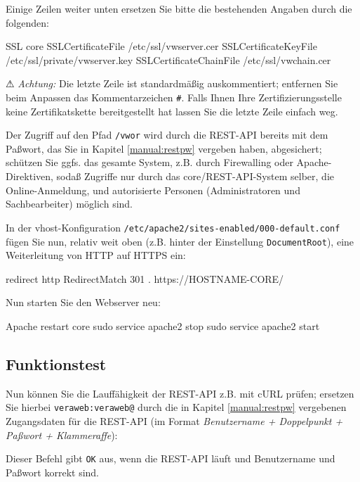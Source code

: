 \documentclass{tarentanleitung}
\begin{document}
\begin{minipage}{\linewidth}
Einige Zeilen weiter unten ersetzen Sie bitte die bestehenden
Angaben durch die folgenden:

\begin{lstdump}{SSL core}
SSLCertificateFile /etc/ssl/vwserver.cer
SSLCertificateKeyFile /etc/ssl/private/vwserver.key
SSLCertificateChainFile /etc/ssl/vwchain.cer
\end{lstdump}

⚠ \emph{Achtung:} Die letzte Zeile ist standardmäßig auskommentiert;
entfernen Sie beim Anpassen das Kommentarzeichen \texttt{\#}. Falls
Ihnen Ihre Zertifizierungsstelle keine Zertifikatskette bereitgestellt
hat lassen Sie die letzte Zeile einfach weg.
\end{minipage}

Der Zugriff auf den Pfad \texttt{/vwor} wird durch die REST-API bereits
mit dem Paßwort, das Sie in Kapitel \ref{manual:restpw} vergeben haben,
abgesichert; schützen Sie ggfs. das gesamte System, z.B. durch Firewalling
oder Apache-Direktiven, sodaß Zugriffe nur durch das core/REST-API-System
selber, die Online-Anmeldung, und autorisierte Personen (Administratoren
und Sachbearbeiter) möglich sind.

\begin{minipage}{\linewidth}
In der vhost-Konfiguration \texttt{/etc/apache2/sites-enabled/000-default.conf}
fügen Sie nun, relativ weit oben (z.B. hinter der Einstellung
\texttt{DocumentRoot}), eine Weiterleitung von HTTP auf HTTPS ein:

\begin{lstdump}{redirect http}
RedirectMatch 301 . https://HOSTNAME-CORE/
\end{lstdump}
\end{minipage}

\begin{minipage}{\linewidth}
Nun starten Sie den Webserver neu:

\begin{lstdump}{Apache restart core}
sudo service apache2 stop
sudo service apache2 start
\end{lstdump}
\end{minipage}

\subsection{Funktionstest}\label{subsec:setup-core-check}

\begin{minipage}{\linewidth}
Nun können Sie die Lauffähigkeit der REST-API z.B. mit cURL prüfen;
ersetzen Sie hierbei \texttt{veraweb:veraweb@} durch die in Kapitel
\ref{manual:restpw} vergebenen Zugangsdaten für die REST-API (im
Format {\itshape Benutzername + Doppelpunkt + Paßwort + Klammeraffe}):


Dieser Befehl gibt \texttt{OK} aus, wenn die REST-API läuft und
Benutzername und Paßwort korrekt sind.
\end{minipage}
\end{document}
